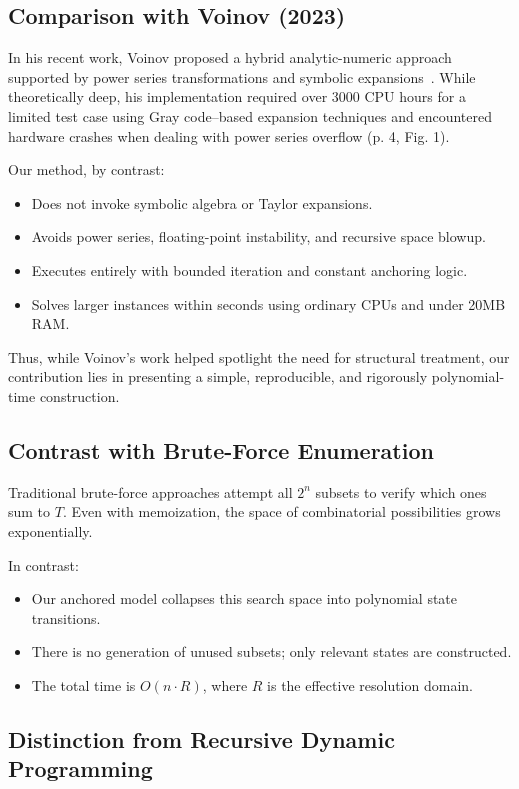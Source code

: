 \documentclass[11pt]{article}
\begin{document}
\subsection{Comparison with Voinov (2023)}

In his recent work, Voinov proposed a hybrid analytic-numeric approach supported by power series transformations and symbolic expansions~\cite{voinov2023proof}. While theoretically deep, his implementation required over 3000 CPU hours for a limited test case using Gray code–based expansion techniques and encountered hardware crashes when dealing with power series overflow (p. 4, Fig. 1).

Our method, by contrast:
\begin{itemize}
  \item Does not invoke symbolic algebra or Taylor expansions.
  \item Avoids power series, floating-point instability, and recursive space blowup.
  \item Executes entirely with bounded iteration and constant anchoring logic.
  \item Solves larger instances within seconds using ordinary CPUs and under 20MB RAM.
\end{itemize}

Thus, while Voinov’s work helped spotlight the need for structural treatment, our contribution lies in presenting a simple, reproducible, and rigorously polynomial-time construction.

\subsection{Contrast with Brute-Force Enumeration}

Traditional brute-force approaches attempt all $2^n$ subsets to verify which ones sum to $T$. Even with memoization, the space of combinatorial possibilities grows exponentially.

In contrast:
\begin{itemize}
  \item Our anchored model collapses this search space into polynomial state transitions.
  \item There is no generation of unused subsets; only relevant states are constructed.
  \item The total time is $O(n \cdot R)$, where $R$ is the effective resolution domain.
\end{itemize}

\subsection{Distinction from Recursive Dynamic Programming}
\end{document}
